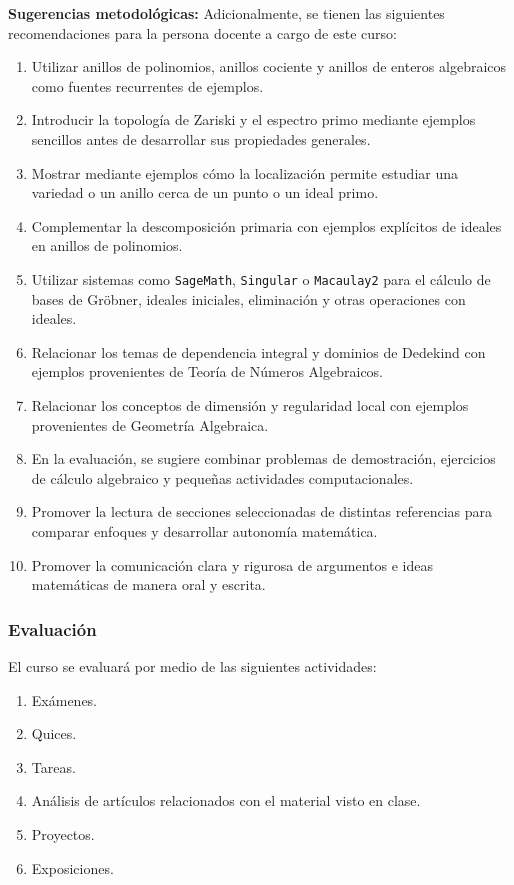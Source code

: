 \begin{refsection}
\textbf{Sugerencias metodológicas:} Adicionalmente, se tienen las siguientes recomendaciones para la persona docente a cargo de este curso:
\begin{enumerate}
    \item Utilizar anillos de polinomios, anillos cociente y anillos de enteros algebraicos como fuentes recurrentes de ejemplos.
    \item Introducir la topología de Zariski y el espectro primo mediante ejemplos sencillos antes de desarrollar sus propiedades generales.
    \item Mostrar mediante ejemplos cómo la localización permite estudiar una variedad o un anillo cerca de un punto o un ideal primo.
    \item Complementar la descomposición primaria con ejemplos explícitos de ideales en anillos de polinomios.
    \item Utilizar sistemas como \texttt{SageMath}, \texttt{Singular} o \texttt{Macaulay2} para el cálculo de bases de Gröbner, ideales iniciales, eliminación y otras operaciones con ideales.
    \item Relacionar los temas de dependencia integral y dominios de Dedekind con ejemplos provenientes de Teoría de Números Algebraicos.
    \item Relacionar los conceptos de dimensión y regularidad local con ejemplos provenientes de Geometría Algebraica.
    \item En la evaluación, se sugiere combinar problemas de demostración, ejercicios de cálculo algebraico y pequeñas actividades computacionales.
    \item Promover la lectura de secciones seleccionadas de distintas referencias para comparar enfoques y desarrollar autonomía matemática.
    \item Promover la comunicación clara y rigurosa de argumentos e ideas matemáticas de manera oral y escrita.
\end{enumerate}


\subsubsection*{Evaluación}

El curso se evaluará por medio de las siguientes actividades:

\begin{enumerate}
\item Exámenes.
\item Quices.
\item Tareas.
\item Análisis de artículos relacionados con el material visto en clase.
\item Proyectos.
\item Exposiciones.
\end{enumerate}


\end{refsection}
